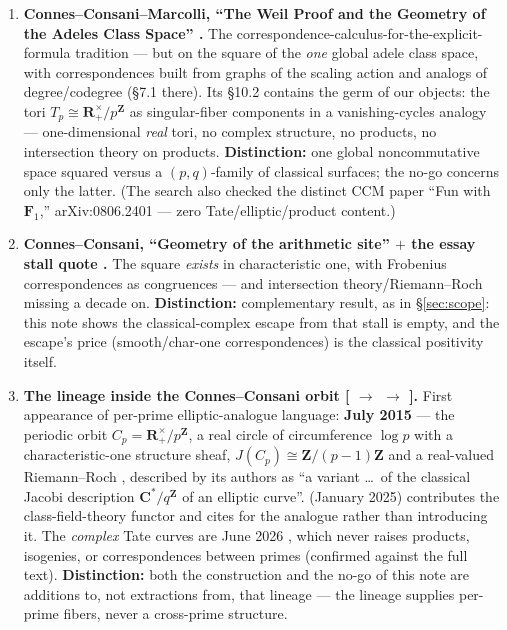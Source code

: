 \documentclass[11pt]{article}
\theoremstyle{definition}
\theoremstyle{remark}
\newcommand{\Z}{\mathbf{Z}}
\newcommand{\R}{\mathbf{R}}
\newcommand{\C}{\mathbf{C}}
\begin{document}
\begin{enumerate}
\item \textbf{Connes--Consani--Marcolli, ``The Weil Proof and the Geometry
of the Adeles Class Space'' \cite{CCM07}.} The
correspondence-calculus-for-the-explicit-formula tradition --- but on the
square of the \emph{one} global adele class space, with correspondences
built from graphs of the scaling action and analogs of degree/codegree
(\S7.1 there). Its \S10.2 contains the germ of our objects: the tori
$T_p \cong \R^\times_{+}/p^\Z$ as singular-fiber components in a
vanishing-cycles analogy --- one-dimensional \emph{real} tori, no complex
structure, no products, no intersection theory on products.
\textbf{Distinction:} one global noncommutative space squared versus a
$(p,q)$-family of classical surfaces; the no-go concerns only the latter.
(The search also checked the distinct CCM paper ``Fun with $\mathbf{F}_1$,''
arXiv:0806.2401 --- zero Tate/elliptic/product content.)
\item \textbf{Connes--Consani, ``Geometry of the arithmetic site''
\cite{CC16} $+$ the essay stall quote \cite[\S4.3.2]{CE15}.} The square
\emph{exists} in characteristic one, with Frobenius correspondences as
congruences --- and intersection theory/Riemann--Roch missing a decade on.
\textbf{Distinction:} complementary result, as in \S\ref{sec:scope}: this
note shows the classical-complex escape from that stall is empty, and the
escape's price (smooth/char-one correspondences) is the classical positivity
itself.
\item \textbf{The lineage inside the Connes--Consani orbit
[\cite{CC16b, CC17} $\to$ \cite{CC25} $\to$ \cite{CC26}].} First appearance of
per-prime elliptic-analogue language: \textbf{July 2015} --- the periodic orbit
$C_p = \R^\times_+/p^{\Z}$, a real circle of circumference $\log p$ with a
characteristic-one structure sheaf, $J(C_p) \cong \Z/(p-1)\Z$ and a real-valued
Riemann--Roch \cite{CC16b, CC17}, described by its authors as ``a variant
\ldots\ of the classical Jacobi description $\C^*/q^{\Z}$ of an elliptic
curve''. \cite{CC25} (January 2025) contributes the class-field-theory functor
and cites \cite{CC17} for the analogue rather than introducing it. The
\emph{complex} Tate curves are June 2026 \cite{CC26}, which never raises
products, isogenies, or correspondences between primes (confirmed against the
full text). \textbf{Distinction:} both the construction and the no-go of this
note are additions to, not extractions from, that lineage --- the lineage
supplies per-prime fibers, never a cross-prime structure.

\end{enumerate}
\end{document}
